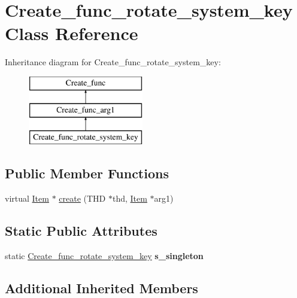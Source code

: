 \hypertarget{classCreate__func__rotate__system__key}{}\section{Create\+\_\+func\+\_\+rotate\+\_\+system\+\_\+key Class Reference}
\label{classCreate__func__rotate__system__key}
Inheritance diagram for Create\+\_\+func\+\_\+rotate\+\_\+system\+\_\+key\+:\begin{figure}[H]
\begin{center}
\leavevmode
\includegraphics[height=3.000000cm]{classCreate__func__rotate__system__key}
\end{center}
\end{figure}
\subsection*{Public Member Functions}
\begin{DoxyCompactItemize}
\item 
virtual \mbox{\hyperlink{classItem}{Item}} $\ast$ \mbox{\hyperlink{classCreate__func__rotate__system__key_a91d8638f781e106e853c3630ce7803dd}{create}} (T\+HD $\ast$thd, \mbox{\hyperlink{classItem}{Item}} $\ast$arg1)
\end{DoxyCompactItemize}
\subsection*{Static Public Attributes}
\begin{DoxyCompactItemize}
\item 
\mbox{\label{classCreate__func__rotate__system__key_ac66b62e1723b39a4e744a5cabfd4075e}} 
static \mbox{\hyperlink{classCreate__func__rotate__system__key}{Create\+\_\+func\+\_\+rotate\+\_\+system\+\_\+key}} {\bfseries s\+\_\+singleton}
\end{DoxyCompactItemize}
\subsection*{Additional Inherited Members}


